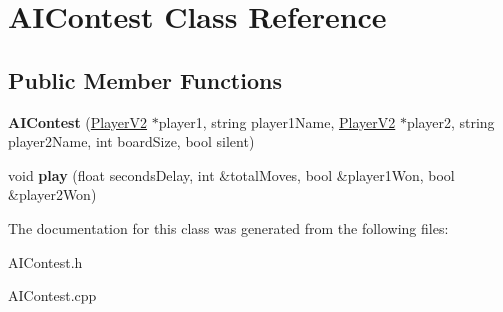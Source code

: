 \hypertarget{classAIContest}{}\section{A\+I\+Contest Class Reference}
\label{classAIContest}
\subsection*{Public Member Functions}
\begin{DoxyCompactItemize}
\item 
{\bfseries A\+I\+Contest} (\hyperlink{classPlayerV2}{Player\+V2} $\ast$player1, string player1\+Name, \hyperlink{classPlayerV2}{Player\+V2} $\ast$player2, string player2\+Name, int board\+Size, bool silent)\hypertarget{classAIContest_afe109fd69a22c589c716977b92c6d5ad}{}\label{classAIContest_afe109fd69a22c589c716977b92c6d5ad}

\item 
void {\bfseries play} (float seconds\+Delay, int \&total\+Moves, bool \&player1\+Won, bool \&player2\+Won)\hypertarget{classAIContest_a13eccb3ca57a7c9de5896b4e6bd2fab4}{}\label{classAIContest_a13eccb3ca57a7c9de5896b4e6bd2fab4}

\end{DoxyCompactItemize}


The documentation for this class was generated from the following files\+:\begin{DoxyCompactItemize}
\item 
A\+I\+Contest.\+h\item 
A\+I\+Contest.\+cpp\end{DoxyCompactItemize}
